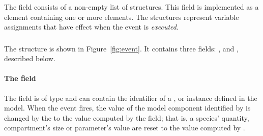 The  field consists of a non-empty list of
\EventAssignment structures.  This field is implemented as a
 element containing one or more
 elements.  The \EventAssignment structures
represent variable assignments that have effect when the event is
\emph{executed}.


\subsubsection{}
\label{sec:eventassignment-sboterm}

The \EventAssignment structure is shown in Figure~\ref{fig:event}.
It contains three fields: ,  and
, described below.


\paragraph{The  field}

The  field is of type  and can
contain the identifier of a \Compartment, \Species or \Parameter
instance defined in the model.  When the event fires, the value of
the model component identified by  is changed by
the \EventAssignment to the value computed by the 
field; that is, a species' quantity, compartment's size or
parameter's value are reset to the value computed by .

